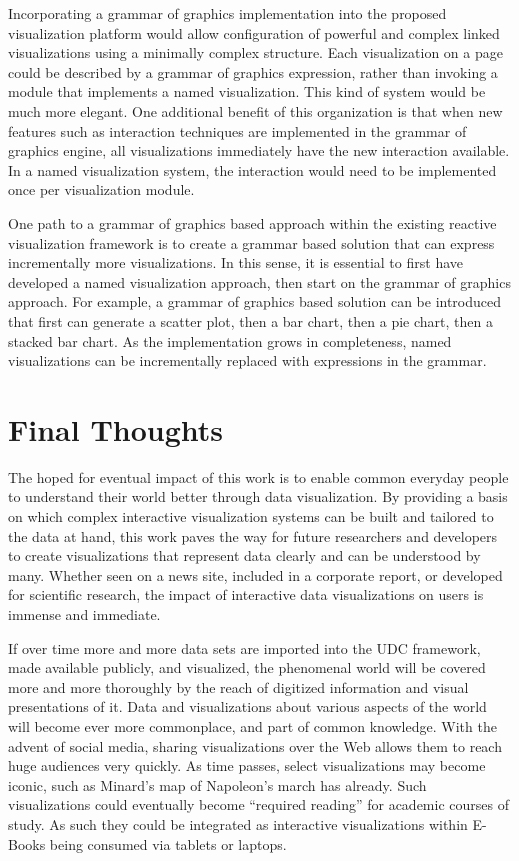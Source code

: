 Incorporating a grammar of graphics implementation into the proposed visualization platform would allow configuration of powerful and complex linked visualizations using a minimally complex structure. Each visualization on a page could be described by a grammar of graphics expression, rather than invoking a module that implements a named visualization. This kind of system would be much more elegant. One additional benefit of this organization is that when new features such as interaction techniques are implemented in the grammar of graphics engine, all visualizations immediately have the new interaction available. In a named visualization system, the interaction would need to be implemented once per visualization module.

One path to a grammar of graphics based approach within the existing reactive visualization framework is to create a grammar based solution that can express incrementally more visualizations. In this sense, it is essential to first have developed a named visualization approach, then start on the grammar of graphics approach. For example, a grammar of graphics based solution can be introduced that first can generate a scatter plot, then a bar chart, then a pie chart, then a stacked bar chart. As the implementation grows in completeness, named visualizations can be incrementally replaced with expressions in the grammar.

\section{Final Thoughts}
The hoped for eventual impact of this work is to enable common everyday people to understand their world better through data visualization. By providing a basis on which complex interactive visualization systems can be built and tailored to the data at hand, this work paves the way for future researchers and developers to create visualizations that represent data clearly and can be understood by many. Whether seen on a news site, included in a corporate report, or developed for scientific research, the impact of interactive data visualizations on users is immense and immediate.

If over time more and more data sets are imported into the UDC framework, made available publicly, and visualized, the phenomenal world will be covered more and more thoroughly by the reach of digitized information and visual presentations of it. Data and visualizations about various aspects of the world will become ever more commonplace, and part of common knowledge. With the advent of social media, sharing visualizations over the Web allows them to reach huge audiences very quickly. As time passes, select visualizations may become iconic, such as Minard's map of Napoleon's march has already. Such visualizations could eventually become ``required reading'' for academic courses of study. As such they could be integrated as interactive visualizations within E-Books being consumed via tablets or laptops.

